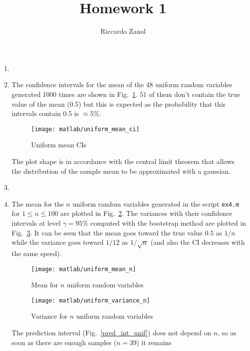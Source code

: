 \documentclass{article}
\author{Riccardo Zanol}
\title{Homework 1}
\newcommand{\inlinecode}[1]{\lstinline[basicstyle=\ttfamily,keywordstyle={}]{#1}}
\begin{document}
\maketitle
\begin{enumerate}
\item
\item The confidence intervals for the mean of the 48 uniform random
  variables generated 1000 times are shown in
  Fig.~\ref{uniform_mean_ci}. $51$ of them don't contain the true
  value of the mean (0.5) but this is expected as the probability that
  this intervals contain 0.5 is $\approx 5\%$.
  \begin{figure}[h]
    \centering
    \texttt{[image: matlab/uniform\_mean\_ci]}
    \caption{Uniform mean CIs}
    \label{uniform_mean_ci}
  \end{figure}
  The plot shape is in accordance with the central limit theorem that
  allows the distribution of the sample mean to be approximated with a
  gaussian.
\item
\item The mean for the $n$ uniform random variables generated in the
  script \inlinecode{ex4.m} for $ 1 \leq n \leq 100 $ are plotted in
  Fig.~\ref{uniform_mean}. The variances with their confidence
  intervals at level $\gamma = 95\%$ computed with the bootstrap
  method are plotted in Fig.~\ref{uniform_var}. It can be seen that
  the mean goes toward the true value $0.5$ as $1/n$ while the
  variance goes toward $1/12$ as $1/\sqrt{n}$ (and also the CI
  decreases with the same speed).
  \begin{figure}[h]
    \centering
    \texttt{[image: matlab/uniform\_mean\_n]}
    \caption{Mean for $n$ uniform random variables}
    \label{uniform_mean}
  \end{figure}
  \begin{figure}[h]
    \centering
    \texttt{[image: matlab/uniform\_variance\_n]}
    \caption{Variance for $n$ uniform random variables}
    \label{uniform_var}
  \end{figure}
  The prediction interval (Fig.~\ref{pred_int_unif}) does not depend
  on $n$, so as soon as there are enough samples ($n=39$) it remains

\end{enumerate}
\end{document}
